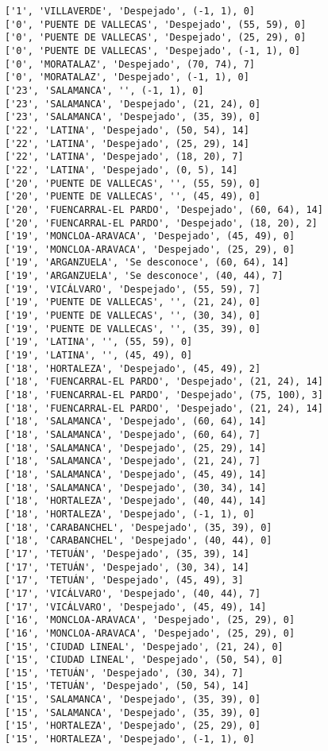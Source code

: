 \documentclass[11pt]{article}
\begin{document}
\begin{Verbatim}[commandchars=\\\{\}]
['1', 'VILLAVERDE', 'Despejado', (-1, 1), 0]
['0', 'PUENTE DE VALLECAS', 'Despejado', (55, 59), 0]
['0', 'PUENTE DE VALLECAS', 'Despejado', (25, 29), 0]
['0', 'PUENTE DE VALLECAS', 'Despejado', (-1, 1), 0]
['0', 'MORATALAZ', 'Despejado', (70, 74), 7]
['0', 'MORATALAZ', 'Despejado', (-1, 1), 0]
['23', 'SALAMANCA', '', (-1, 1), 0]
['23', 'SALAMANCA', 'Despejado', (21, 24), 0]
['23', 'SALAMANCA', 'Despejado', (35, 39), 0]
['22', 'LATINA', 'Despejado', (50, 54), 14]
['22', 'LATINA', 'Despejado', (25, 29), 14]
['22', 'LATINA', 'Despejado', (18, 20), 7]
['22', 'LATINA', 'Despejado', (0, 5), 14]
['20', 'PUENTE DE VALLECAS', '', (55, 59), 0]
['20', 'PUENTE DE VALLECAS', '', (45, 49), 0]
['20', 'FUENCARRAL-EL PARDO', 'Despejado', (60, 64), 14]
['20', 'FUENCARRAL-EL PARDO', 'Despejado', (18, 20), 2]
['19', 'MONCLOA-ARAVACA', 'Despejado', (45, 49), 0]
['19', 'MONCLOA-ARAVACA', 'Despejado', (25, 29), 0]
['19', 'ARGANZUELA', 'Se desconoce', (60, 64), 14]
['19', 'ARGANZUELA', 'Se desconoce', (40, 44), 7]
['19', 'VICÁLVARO', 'Despejado', (55, 59), 7]
['19', 'PUENTE DE VALLECAS', '', (21, 24), 0]
['19', 'PUENTE DE VALLECAS', '', (30, 34), 0]
['19', 'PUENTE DE VALLECAS', '', (35, 39), 0]
['19', 'LATINA', '', (55, 59), 0]
['19', 'LATINA', '', (45, 49), 0]
['18', 'HORTALEZA', 'Despejado', (45, 49), 2]
['18', 'FUENCARRAL-EL PARDO', 'Despejado', (21, 24), 14]
['18', 'FUENCARRAL-EL PARDO', 'Despejado', (75, 100), 3]
['18', 'FUENCARRAL-EL PARDO', 'Despejado', (21, 24), 14]
['18', 'SALAMANCA', 'Despejado', (60, 64), 14]
['18', 'SALAMANCA', 'Despejado', (60, 64), 7]
['18', 'SALAMANCA', 'Despejado', (25, 29), 14]
['18', 'SALAMANCA', 'Despejado', (21, 24), 7]
['18', 'SALAMANCA', 'Despejado', (45, 49), 14]
['18', 'SALAMANCA', 'Despejado', (30, 34), 14]
['18', 'HORTALEZA', 'Despejado', (40, 44), 14]
['18', 'HORTALEZA', 'Despejado', (-1, 1), 0]
['18', 'CARABANCHEL', 'Despejado', (35, 39), 0]
['18', 'CARABANCHEL', 'Despejado', (40, 44), 0]
['17', 'TETUÁN', 'Despejado', (35, 39), 14]
['17', 'TETUÁN', 'Despejado', (30, 34), 14]
['17', 'TETUÁN', 'Despejado', (45, 49), 3]
['17', 'VICÁLVARO', 'Despejado', (40, 44), 7]
['17', 'VICÁLVARO', 'Despejado', (45, 49), 14]
['16', 'MONCLOA-ARAVACA', 'Despejado', (25, 29), 0]
['16', 'MONCLOA-ARAVACA', 'Despejado', (25, 29), 0]
['15', 'CIUDAD LINEAL', 'Despejado', (21, 24), 0]
['15', 'CIUDAD LINEAL', 'Despejado', (50, 54), 0]
['15', 'TETUÁN', 'Despejado', (30, 34), 7]
['15', 'TETUÁN', 'Despejado', (50, 54), 14]
['15', 'SALAMANCA', 'Despejado', (35, 39), 0]
['15', 'SALAMANCA', 'Despejado', (35, 39), 0]
['15', 'HORTALEZA', 'Despejado', (25, 29), 0]
['15', 'HORTALEZA', 'Despejado', (-1, 1), 0]

\end{Verbatim}
\end{document}
